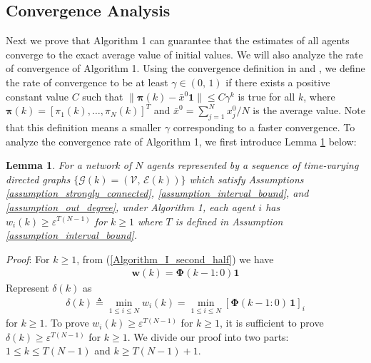 \documentclass{IEEEtran}
\newtheorem{Lemma}{Lemma}
\begin{document}
\subsection{Convergence Analysis}

Next we prove that Algorithm 1 can guarantee that the estimates of all agents converge to the exact average value of initial values. We will also analyze the rate of convergence of Algorithm 1. Using the convergence definition in \cite{nedic2017achieving} and \cite{nedich2016geometrically}, we define the rate of convergence to be at least $\gamma \in (0, \, 1)$ if there exists a positive constant value $C$ such that $\big\|\boldsymbol{\pi}(k) - \bar{x}^0 \mathbf{1} \big\| \leq C \gamma ^k$ is true for all $k$, where $\boldsymbol{\pi}(k)=[\pi_1(k), \ldots, \pi_N(k)]^{T}$ and $\bar{x}^0={\sum_{j=1}^{N}x_j^0}/N$ is the average value. Note that this definition means a smaller $\gamma$ corresponding to a faster convergence. To analyze the convergence rate of Algorithm 1, we first introduce Lemma \ref{lemma_1} below:

\begin{Lemma}\label{lemma_1}
	For a network of $N$ agents represented by a sequence of time-varying directed graphs $\{\mathcal{G}(k)=(\mathcal{V}, \, \mathcal{E}(k))\}$ which satisfy Assumptions \ref{assumption_strongly_connected}, \ref{assumption_interval_bound}, and \ref{assumption_out_degree}, under Algorithm 1, each agent $i$ has $w_i(k) \geq \varepsilon^{T(N-1)}$ for $k \geq 1$ where $T$ is defined in Assumption \ref{assumption_interval_bound}.
\end{Lemma}

{\it Proof}: For $k \geq 1$, from (\ref{Algorithm_I_second_half}) we have
\begin{equation}\label{Lemma_1_01} 
\begin{aligned}
\mathbf{w}(k) = \mathbf{\Phi}(k-1:0) \mathbf{1}
\end{aligned}
\end{equation}	
Represent $\delta(k)$ as
\begin{equation}\label{Lemma_1_02}
\begin{aligned}
\delta(k) \triangleq \min_{1 \leq i \leq N}{w}_i(k) = \min_{1 \leq i \leq N} [\mathbf{\Phi}(k-1:0) \, \mathbf{1}]_i
\end{aligned}
\end{equation}
for $k \geq 1$. To prove $w_i(k) \geq \varepsilon^{T(N-1)}$ for $k \geq 1$, it is sufficient to prove $\delta(k) \geq \varepsilon^{T(N-1)}$ for $k \geq 1$. We divide our proof into two parts: $1 \leq k \leq T(N-1)$ and $k \geq T(N-1)+1$.
\end{document}
